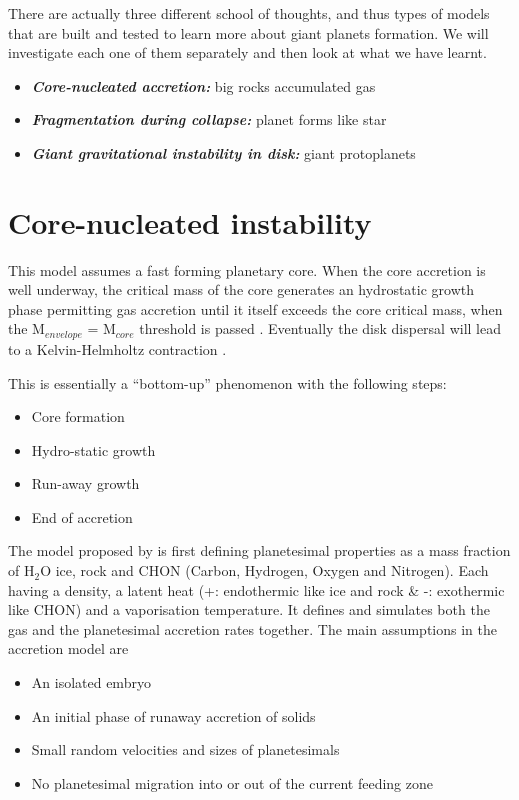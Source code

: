 \documentclass[12pt]{article} %
\begin{document}
There are actually three different school of thoughts, and thus types of models that are built and tested to learn more about giant planets formation. We will investigate each one of them separately and then look at what we have learnt.

\begin{itemize}
\setlength\itemsep{0em}  
\item \textit{\textbf{Core-nucleated accretion:}} big rocks accumulated gas 
\item \textit{\textbf{Fragmentation during collapse:}} planet forms like star
\item \textit{\textbf{Giant gravitational instability in disk:}} giant protoplanets 
\end{itemize}



\section{Core-nucleated instability}\vspace{-2ex}\titlerule[1pt]\bigskip

This model assumes a fast forming planetary core. When the core accretion is well underway, the critical mass of the core generates an hydrostatic growth phase permitting gas accretion until it itself exceeds the core critical mass, when the M$_{envelope}$ = M$_{core}$ threshold is passed \cite{miguel2008core}. Eventually the disk dispersal will lead to a Kelvin-Helmholtz contraction \cite{armitage2010astrophysics}. \newline\linebreak
\clearpage

\noindent This is essentially a ``bottom-up'' phenomenon with the following steps:
\begin{itemize}
\setlength\itemsep{0em}
\item Core formation
\item Hydro-static growth
\item Run-away growth
\item End of accretion
\end{itemize}

\noindent The model proposed by \cite{pollack1996formation} is first defining planetesimal properties as a mass fraction of H$_2$O ice, rock and CHON (Carbon, Hydrogen, Oxygen and Nitrogen). Each having a density, a latent heat (+: endothermic like ice and rock \& -: exothermic like CHON) and a vaporisation temperature. It defines and simulates both the gas and the planetesimal accretion rates together. \newline\linebreak
The main assumptions in the accretion model are 
\begin{itemize}
\setlength\itemsep{0em}
\item An isolated embryo
\item An initial phase of runaway accretion of solids
\item Small random velocities and sizes of planetesimals
\item No planetesimal migration into or out of the current feeding zone
\end{itemize}
\end{document}
